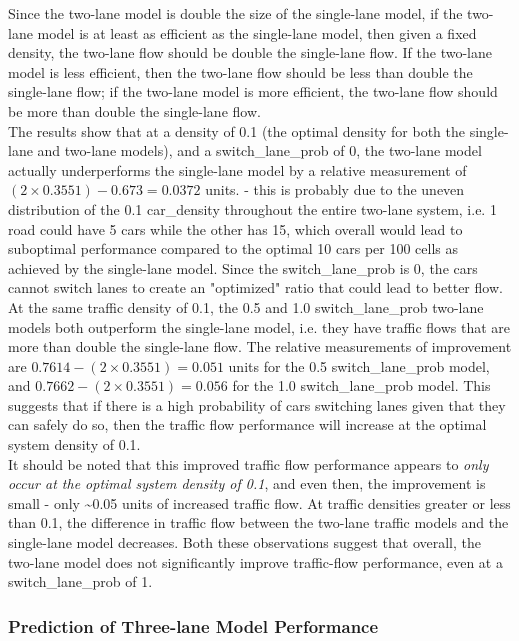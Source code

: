 \documentclass[11pt]{article}
\begin{document}
Since the two-lane model is double the size of the single-lane model, if
the two-lane model is at least as efficient as the single-lane model,
then given a fixed density, the two-lane flow should be double the
single-lane flow. If the two-lane model is less efficient, then the
two-lane flow should be less than double the single-lane flow; if the
two-lane model is more efficient, the two-lane flow should be more than
double the single-lane flow.\\

The results show that at a density of 0.1 (the optimal density for both
the single-lane and two-lane models), and a switch\_lane\_prob of 0, the
two-lane model actually underperforms the single-lane model by a
relative measurement of \((2 \times 0.3551) - 0.673 = 0.0372\) units. -
this is probably due to the uneven distribution of the 0.1 car\_density
throughout the entire two-lane system, i.e. 1 road could have 5 cars
while the other has 15, which overall would lead to suboptimal
performance compared to the optimal 10 cars per 100 cells as achieved by
the single-lane model. Since the switch\_lane\_prob is 0, the cars
cannot switch lanes to create an "optimized" ratio that could lead to
better flow.\\

At the same traffic density of 0.1, the 0.5 and 1.0 switch\_lane\_prob
two-lane models both outperform the single-lane model, i.e. they have
traffic flows that are more than double the single-lane flow. The
relative measurements of improvement are
\(0.7614 - (2 \times 0.3551)= 0.051\) units for the 0.5
switch\_lane\_prob model, and \(0.7662 - (2 \times 0.3551)= 0.056\) for
the 1.0 switch\_lane\_prob model. This suggests that if there is a high
probability of cars switching lanes given that they can safely do so,
then the traffic flow performance will increase at the optimal system
density of 0.1.\\

It should be noted that this improved traffic flow performance appears
to \emph{only occur at the optimal system density of 0.1}, and even
then, the improvement is small - only \textasciitilde{}0.05 units of
increased traffic flow. At traffic densities greater or less than 0.1,
the difference in traffic flow between the two-lane traffic models and
the single-lane model decreases. Both these observations suggest that
overall, the two-lane model does not significantly improve traffic-flow
performance, even at a switch\_lane\_prob of 1.

\subsubsection{Prediction of Three-lane Model Performance}
\end{document}
